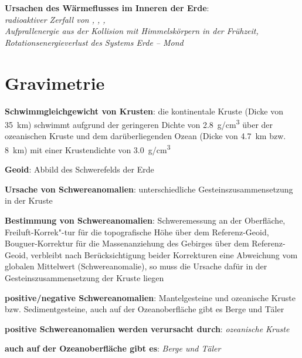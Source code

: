 \begin{wichtig}
    \item
    \textbf{Ursachen des Wärmeflusses im Inneren der Erde}:\\
    \emph{radioaktiver Zerfall von , , ,\\
    Aufprallenergie aus der Kollision mit Himmelskörpern in der Frühzeit,\\
    Rotationsenergieverlust des Systems Erde -- Mond}
\end{wichtig}

\section{%
    Gravimetrie%
}

\textbf{Schwimmgleichgewicht von Krusten}:
die kontinentale Kruste (Dicke von \SI{35}{\kilo\meter}) schwimmt aufgrund der geringeren
Dichte von \SI{2.8}{\gram/\centi\meter\cubed} über der ozeanischen Kruste und dem
darüberliegenden Ozean (Dicke von \SI{4.7}{\kilo\meter} bzw. \SI{8}{\kilo\meter})
mit einer Krustendichte von \SI{3.0}{\gram/\centi\meter\cubed}

\textbf{Geoid}:
Abbild des Schwerefelds der Erde

\textbf{Ursache von Schwereanomalien}:
unterschiedliche Gesteinszusammensetzung in der Kruste

\textbf{Bestimmung von Schwereanomalien}:
Schweremessung an der Oberfläche,
Freiluft-Korrek"-tur für die topografische Höhe über dem Referenz-Geoid,
Bouguer-Korrektur für die Massenanziehung des Gebirges über dem Referenz-Geoid,
verbleibt nach Berücksichtigung beider Korrekturen eine Abweichung vom globalen Mittelwert
(Schwereanomalie), so muss die Ursache dafür in der Gesteinszusammensetzung der Kruste liegen

\textbf{positive/negative Schwereanomalien}:
Mantelgesteine und ozeanische Kruste bzw. Sedimentgesteine,
auch auf der Ozeanoberfläche gibt es Berge und Täler

\begin{wichtig}
    \item
    \textbf{positive Schwereanomalien werden verursacht durch}:
    \emph{ozeanische Kruste}

    \item
    \textbf{auch auf der Ozeanoberfläche gibt es}:
    \emph{Berge und Täler}
\end{wichtig}

\pagebreak

